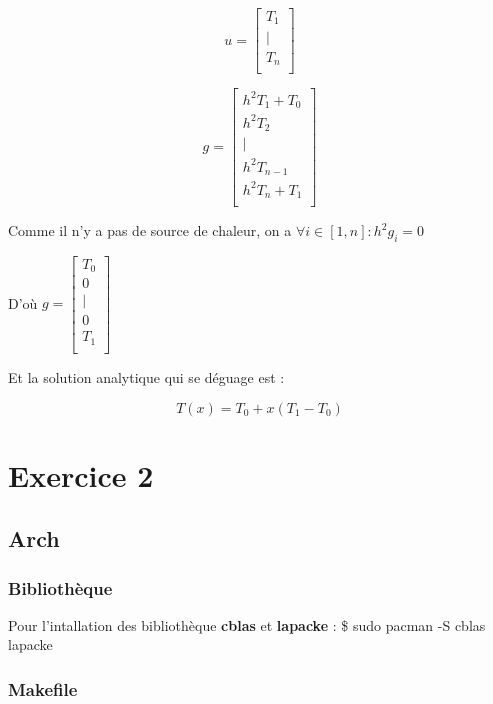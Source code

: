 \documentclass[11pt]{article}
\begin{document}
\begin{equation*}
  u = \left[
    \begin{array}{c}
      T_1 \\
      | \\
      T_n \\
    \end{array}
    \right]
\end{equation*}

\begin{equation*}
  g = \left[
    \begin{array}{c}
      h^2 T_1 + T_0 \\
      h^2 T_2 \\
      | \\
      h^2 T_{n-1} \\
      h^2T_n + T_1\\
    \end{array}
    \right]
\end{equation*}

Comme il n'y a pas de source de chaleur, on a $\forall i \in [ 1, n
] : h^2 g_i = 0$

D'où $g = \left[
  \begin{array}{c}
    T_0 \\
    0 \\
    | \\
    0 \\
    T_1 \\
  \end{array}
  \right]$

Et la solution analytique qui se déguage est : 

$$ T(x) = T_0 + x (T_1 - T_0) $$

\section{Exercice 2}
\subsection{Arch}
\subsubsection{Bibliothèque}

Pour l'intallation des bibliothèque \textbf{cblas} et \textbf{lapacke}
:
\newline
\$ sudo pacman -S cblas lapacke

\subsubsection{Makefile}
\end{document}
